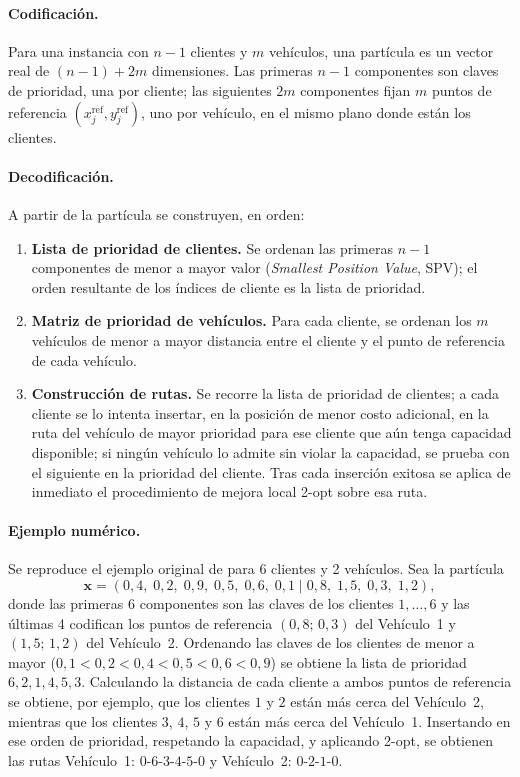 \paragraph{Codificación.} Para una instancia con $n-1$ clientes y $m$ vehículos, una
partícula es un vector real de $(n-1) + 2m$ dimensiones. Las primeras $n-1$ componentes
son claves de prioridad, una por cliente; las siguientes $2m$ componentes fijan $m$
puntos de referencia $(x_j^{\text{ref}}, y_j^{\text{ref}})$, uno por vehículo, en el
mismo plano donde están los clientes.

\paragraph{Decodificación.} A partir de la partícula se construyen, en orden:
\begin{enumerate}
    \item \textbf{Lista de prioridad de clientes.} Se ordenan las primeras $n-1$
    componentes de menor a mayor valor (\textit{Smallest Position Value}, SPV); el orden
    resultante de los índices de cliente es la lista de prioridad.
    \item \textbf{Matriz de prioridad de vehículos.} Para cada cliente, se ordenan los
    $m$ vehículos de menor a mayor distancia entre el cliente y el punto de referencia de
    cada vehículo.
    \item \textbf{Construcción de rutas.} Se recorre la lista de prioridad de clientes; a
    cada cliente se lo intenta insertar, en la posición de menor costo adicional, en la
    ruta del vehículo de mayor prioridad para ese cliente que aún tenga capacidad
    disponible; si ningún vehículo lo admite sin violar la capacidad, se prueba con el
    siguiente en la prioridad del cliente. Tras cada inserción exitosa se aplica de
    inmediato el procedimiento de mejora local 2-opt sobre esa ruta.
\end{enumerate}

\paragraph{Ejemplo numérico.} Se reproduce el ejemplo original de \textcite{ai2009particle}
para 6 clientes y 2 vehículos. Sea la partícula
\[
\mathbf{x} = (0{,}4,\; 0{,}2,\; 0{,}9,\; 0{,}5,\; 0{,}6,\; 0{,}1 \mid 0{,}8,\; 1{,}5,\; 0{,}3,\; 1{,}2),
\]
donde las primeras 6 componentes son las claves de los clientes $1,\ldots,6$ y las
últimas 4 codifican los puntos de referencia $(0{,}8;\,0{,}3)$ del Vehículo~1 y
$(1{,}5;\,1{,}2)$ del Vehículo~2. Ordenando las claves de los clientes de menor a mayor
($0{,}1 < 0{,}2 < 0{,}4 < 0{,}5 < 0{,}6 < 0{,}9$) se obtiene la lista de prioridad
$6,2,1,4,5,3$. Calculando la distancia de cada cliente a ambos puntos de referencia se
obtiene, por ejemplo, que los clientes $1$ y $2$ están más cerca del Vehículo~2, mientras
que los clientes $3$, $4$, $5$ y $6$ están más cerca del Vehículo~1. Insertando en ese
orden de prioridad, respetando la capacidad, y aplicando 2-opt, se obtienen las rutas
Vehículo~1: $0$-$6$-$3$-$4$-$5$-$0$ y Vehículo~2: $0$-$2$-$1$-$0$.

